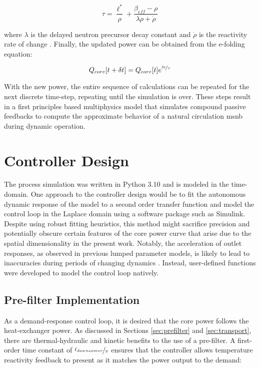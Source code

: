 \begin{equation}
    \tau = \frac{\ell^{*}}{\rho}
         +\frac{\beta_{eff}-\rho}{\lambda\rho + \dot{\rho}}
\end{equation}

where $\lambda$ is the delayed neutron precursor decay constant and $\dot{\rho}$ is the reactivity rate of change \cite[Ch. 6]{DH}. Finally, the updated power can be obtained from the e-folding equation:

\begin{equation}
    Q_{core}[t+\delta t] = Q_{core}[t] e^{\nicefrac{\delta t}{\tau}}
\end{equation}

With the new power, the entire sequence of calculations can be repeated for the next discrete time-step, repeating until the simulation is over. These steps result in a first principles based multiphysics model that simulates compound passive feedbacks to compute the approximate behavior of a natural circulation \acs{msnb} during dynamic operation.

\section{Controller Design}
\label{Section:Design}

The process simulation was written in Python 3.10 and is modeled in the time-domain. One approach to the controller design would be to fit the autonomous dynamic response of the model to a second order transfer function and model the control loop in the Laplace domain using a software package such as Simulink. Despite using robust fitting heuristics, this method might sacrifice precision and potentially obscure certain features of the core power curve that arise due to the spatial dimensionality in the present work.  Notably, the acceleration of outlet responses, as observed in previous lumped parameter models, is likely to lead to inaccuracies during periods of changing dynamics \cite{msreSimulink}. Instead, user-defined functions were developed to model the control loop natively.

\subsection{Pre-filter Implementation}
As a demand-response control loop, it is desired that the core power follows the heat-exchanger power. As discussed in Sections \ref{sec:prefilter} and \ref{sec:transport}, there are thermal-hydraulic and kinetic benefits to the use of a pre-filter. A first-order time constant of $\nicefrac{\ell_{downcomer}}{v}$ ensures that the controller allows temperature reactivity feedback to present as it matches the power output to the demand:

